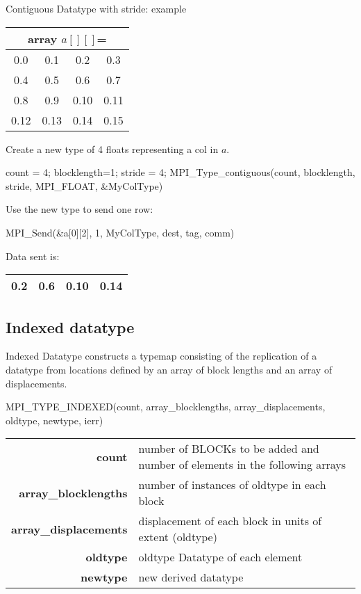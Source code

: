 \documentclass[aspectratio=43]{beamer}
\begin{document}
\begin{frame}[fragile]{Contiguous Datatype with stride: example}
\begin{center}
\begin{tabular}{|c|c|c|c|}
    \multicolumn{4}{c}{array $a[][]$=}\\\hline
0.0  & 0.1  & 0.2  & 0.3\\\hline
0.4  & 0.5  & 0.6  & 0.7\\\hline
0.8  & 0.9  & 0.10 & 0.11\\\hline
0.12 & 0.13 & 0.14 & 0.15\\\hline
\end{tabular}
\end{center}
Create a new type of 4 floats representing a col in $a$.\\
\begin{Cpplisting}[]{}
count = 4; blocklength=1; stride = 4;
MPI_Type_contiguous(count, blocklength, stride, MPI_FLOAT, &MyColType)
\end{Cpplisting}
Use the new type to send one row:\\
\begin{Cpplisting}[]{}
MPI_Send(&a[0][2], 1, MyColType, dest, tag, comm)
\end{Cpplisting}
Data sent is:
\begin{tabular}{|c|c|c|c|}
\hline
\color{cscsblue}0.2  & \color{cscsblue}0.6  & \color{cscsblue}0.10 & \color{cscsblue}0.14\\
\hline
\end{tabular}

\end{frame}

\subsection{Indexed datatype}
\begin{frame}[fragile]{Indexed Datatype}
 constructs a typemap consisting of the replication of a datatype from locations defined by an array of block lengths and an array of displacements.
\begin{Cpplisting}[]{}
MPI_TYPE_INDEXED(count, array_blocklengths, array_displacements, oldtype, newtype, ierr)
\end{Cpplisting}
\begin{black1block}{}
\begin{tabular}{rp{6.4cm}}
\textbf{count} & number of BLOCKs to be added and number of elements in the following arrays\\
\textbf{array\_blocklengths} & number of instances of oldtype in each block\\
\textbf{array\_displacements} & displacement of each block in units of extent (oldtype)\\
\textbf{oldtype} & oldtype Datatype of each element\\
\textbf{newtype} & new derived datatype\\
\end{tabular}
\end{black1block}
\end{frame}
\end{document}
